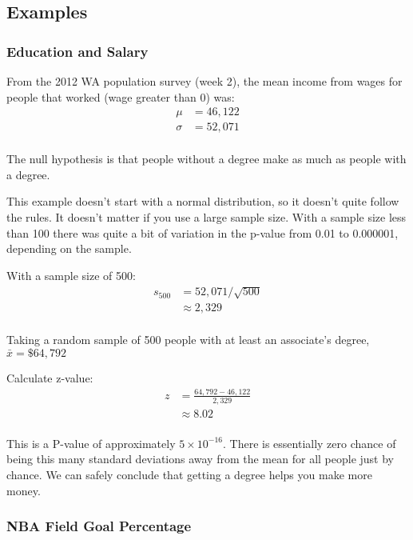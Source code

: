 \documentclass[landscape]{exam}
\begin{document}
  \subsection{Examples}

  \subsubsection{Education and Salary}

  From the 2012 WA population survey (week 2), the mean income from wages for
  people that worked (wage greater than 0) was:
  \begin{align*}
    \mu    & = 46,122 \\
    \sigma & = 52,071 \\
  \end{align*}

  The null hypothesis is that people without a degree make as much as people
  with a degree.

  This example doesn't start with a normal distribution, so it doesn't quite
  follow the rules. It doesn't matter if you use a large sample size. With a
  sample size less than 100 there was quite a bit of variation in the p-value
  from 0.01 to 0.000001, depending on the sample.

  With a sample size of 500:
  \begin{align*}
    s_{500} & = 52,071 / \sqrt{500} \\
                     & \approx 2,329 \\
  \end{align*}

  Taking a random sample of 500 people with at least an associate's degree, 
  $\bar{x} = \$64,792$

  Calculate z-value:
  \begin{align*}
    z & = \frac{64,792 - 46,122}{2,329} \\
      & \approx 8.02 \\
  \end{align*}

  This is a P-value of approximately $5 \times 10^{-16}$. There is essentially
  zero chance of being this many standard deviations away from the mean for all
  people just by chance. We can safely conclude that getting a degree helps you
  make more money.

  \subsubsection{NBA Field Goal Percentage}
\end{document}

